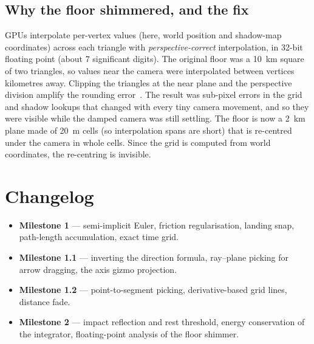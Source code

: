 \documentclass[11pt]{article}
\begin{document}
\subsection{Why the floor shimmered, and the fix}
GPUs interpolate per-vertex values (here, world position and shadow-map coordinates) across each triangle with
\emph{perspective-correct} interpolation, in 32-bit floating point (about 7 significant digits). The original floor was a
\SI{10}{km} square of two triangles, so values near the camera were interpolated between vertices kilometres away. Clipping
the triangles at the near plane and the perspective division amplify the rounding error~\cite{goldberg1991}. The result was
sub-pixel errors in the grid and shadow lookups that changed with every tiny camera movement, and so they were visible while
the damped camera was still settling. The floor is now a \SI{2}{km} plane made of \SI{20}{m} cells (so interpolation spans
are short) that is re-centred under the camera in whole cells. Since the grid is computed from world coordinates, the
re-centring is invisible.

\section*{Changelog}
\begin{itemize}
  \item \textbf{Milestone 1} --- semi-implicit Euler, friction regularisation, landing snap,
        path-length accumulation, exact time grid.
  \item \textbf{Milestone 1.1} --- inverting the direction formula, ray--plane picking for
        arrow dragging, the axis gizmo projection.
  \item \textbf{Milestone 1.2} --- point-to-segment picking, derivative-based grid lines, distance fade.
  \item \textbf{Milestone 2} --- impact reflection and rest threshold, energy conservation of the integrator,
        floating-point analysis of the floor shimmer.
\end{itemize}

\printbibliography
\end{document}
